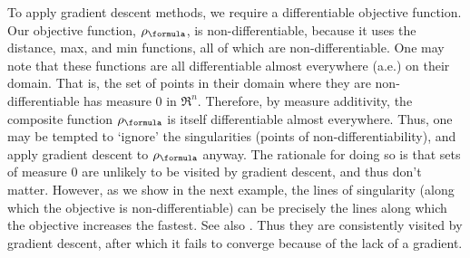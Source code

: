 To apply gradient descent methods, we require a differentiable objective function. 
Our objective function, $\robf$, is non-differentiable, because it uses the distance, max, and min functions, all of which are non-differentiable.
One may note that these functions are all differentiable almost everywhere (a.e.) on their domain.
That is, the set of points in their domain where they are non-differentiable has measure 0 in $\Re^n$. 
Therefore, by measure additivity, the composite function $\robf$ is itself differentiable almost everywhere.
Thus, one may be tempted to `ignore' the singularities (points of non-differentiability), and apply gradient descent to $\robf$ anyway.
The rationale for doing so is that sets of measure 0 are unlikely to be visited by gradient descent, and thus don't matter. 
However, as we show in the next example, the lines of singularity (along which the objective is non-differentiable) can be  precisely the lines along which the objective increases the fastest.
See also \cite{Cortes08_Discontinuous}.
Thus they are consistently visited by gradient descent, after which it fails to converge because of the lack of a gradient.


